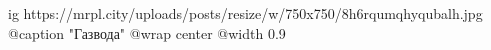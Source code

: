  
 
 
 
 

\ifcmt
  ig https://mrpl.city/uploads/posts/resize/w/750x750/8h6rqumqhyqubalh.jpg
	@caption "Газвода"
  @wrap center
  @width 0.9
\fi
